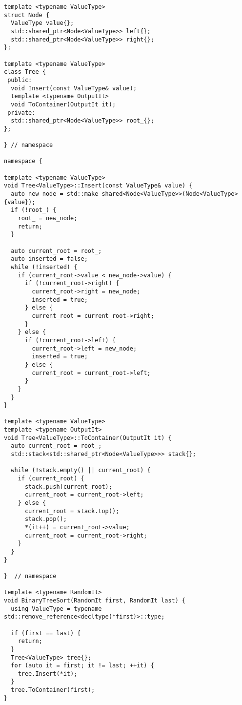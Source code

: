 \begin{lstlisting}[label=lst:vst_sort,caption= Алгоритм сортировки бинарным деревом]
template <typename ValueType>
struct Node {
  ValueType value{};
  std::shared_ptr<Node<ValueType>> left{};
  std::shared_ptr<Node<ValueType>> right{};
};

template <typename ValueType>
class Tree {
 public:
  void Insert(const ValueType& value);
  template <typename OutputIt>
  void ToContainer(OutputIt it);
 private:
  std::shared_ptr<Node<ValueType>> root_{};
};

} // namespace

namespace {

template <typename ValueType>
void Tree<ValueType>::Insert(const ValueType& value) {
  auto new_node = std::make_shared<Node<ValueType>>(Node<ValueType>{value});
  if (!root_) {
    root_ = new_node;
    return;
  }

  auto current_root = root_;
  auto inserted = false;
  while (!inserted) {
    if (current_root->value < new_node->value) {
      if (!current_root->right) {
        current_root->right = new_node;
        inserted = true;
      } else {
        current_root = current_root->right;
      }
    } else {
      if (!current_root->left) {
        current_root->left = new_node;
        inserted = true;
      } else {
        current_root = current_root->left;
      }
    }
  }
}

template <typename ValueType>
template <typename OutputIt>
void Tree<ValueType>::ToContainer(OutputIt it) {
  auto current_root = root_;
  std::stack<std::shared_ptr<Node<ValueType>>> stack{};

  while (!stack.empty() || current_root) {
    if (current_root) {
      stack.push(current_root);
      current_root = current_root->left;
    } else {
      current_root = stack.top();
      stack.pop();
      *(it++) = current_root->value;
      current_root = current_root->right;
    }
  }
}

}  // namespace

template <typename RandomIt>
void BinaryTreeSort(RandomIt first, RandomIt last) {
  using ValueType = typename std::remove_reference<decltype(*first)>::type;

  if (first == last) {
    return;
  }
  Tree<ValueType> tree{};
  for (auto it = first; it != last; ++it) {
    tree.Insert(*it);
  }
  tree.ToContainer(first);
}
\end{lstlisting}

